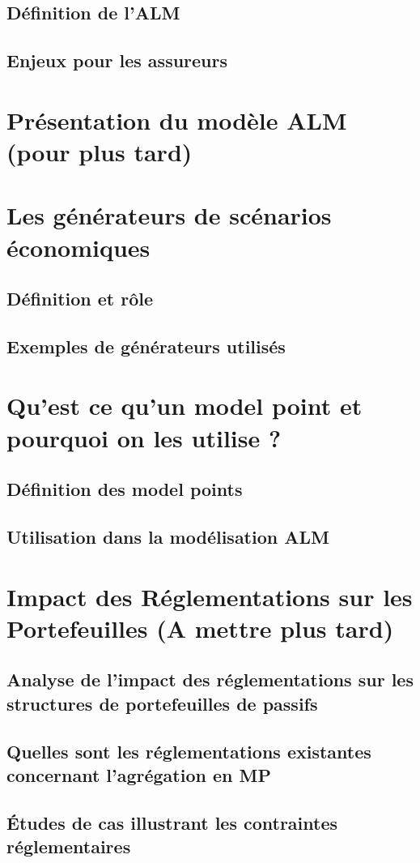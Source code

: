 \subsection{Définition de l’ALM}
\subsection{Enjeux pour les assureurs}

\section{Présentation du modèle ALM (pour plus tard)}

\section{Les générateurs de scénarios économiques}
\subsection{Définition et rôle}
\subsection{Exemples de générateurs utilisés}

\section{Qu’est ce qu’un model point et pourquoi on les utilise ?}
\subsection{Définition des model points}
\subsection{Utilisation dans la modélisation ALM}

\section{Impact des Réglementations sur les Portefeuilles (A mettre plus tard)}
\subsection{Analyse de l'impact des réglementations sur les structures de portefeuilles de passifs}
\subsection{Quelles sont les réglementations existantes concernant l’agrégation en MP}
\subsection{Études de cas illustrant les contraintes réglementaires}


